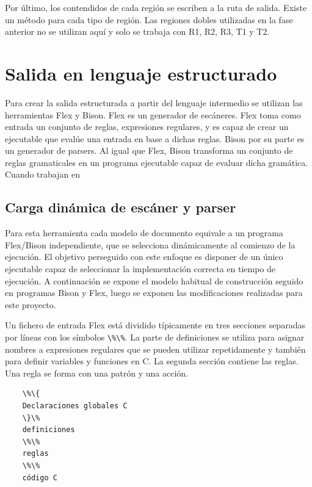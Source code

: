 Por último, los contendidos de cada región se escriben a la ruta de salida. Existe un método para cada tipo de región. Las regiones dobles utilizadas en la fase anterior no se utilizan aquí y solo se trabaja con R1, R2, R3, T1 y T2.

\section{Salida en lenguaje estructurado}

Para crear la salida estructurada a partir del lenguaje intermedio se utilizan las herramientas Flex y Bison. Flex es un generador de escáneres. Flex toma como entrada un conjunto de reglas, expresiones regulares, y es capaz de crear un ejecutable que evalúe una entrada en base a dichas reglas. Bison por su parte es un generador de parsers. Al igual que Flex, Bison transforma un conjunto de reglas gramaticales en un programa ejecutable capaz de evaluar dicha gramática. Cuando trabajan en %

\subsection{Carga dinámica de escáner y parser}

Para esta herramienta cada modelo de documento equivale a un programa Flex/Bison independiente, que se selecciona dinámicamente al comienzo de la ejecución. El objetivo perseguido con este enfoque es disponer de un único ejecutable capaz de seleccionar la implementación correcta en tiempo de ejecución. A continuación se expone el modelo habitual de construcción seguido en programas Bison y Flex, luego se exponen las modificaciones realizadas para este proyecto.

Un fichero de entrada Flex está dividido típicamente en tres secciones separadas por líneas con los símbolos \verb|\%\%|. La parte de definiciones se utiliza para asignar nombres a expresiones regulares que se pueden utilizar repetidamente y también para definir variables y funciones en C. La segunda sección contiene las reglas. Una regla se forma con una patrón y una acción.

\begin{verbatim}
    \%\{
    Declaraciones globales C
    \}\%
    definiciones
    \%\% 
    reglas
    \%\% 
    código C
\end{verbatim}

